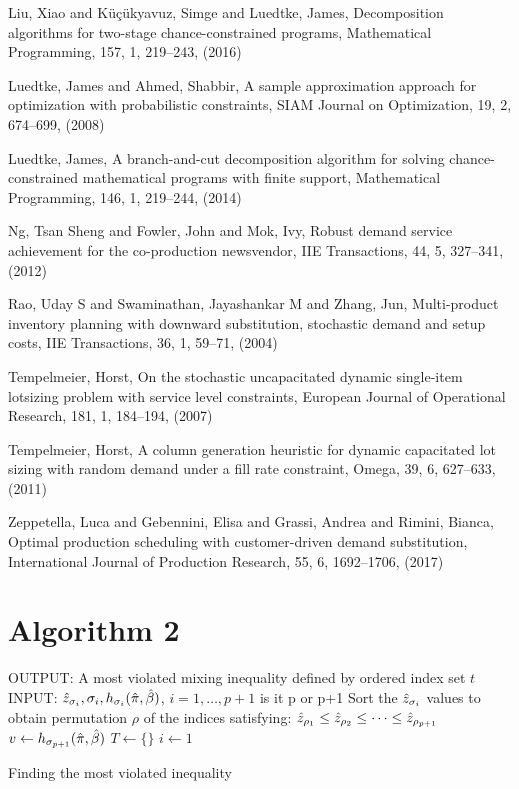 \documentclass[10pt]{article}
\newcommand{\ti}{t} %
\newcommand{\cred}{\color{red!65!black}}
\begin{document}
\begin{thebibliography}{99}
Liu, Xiao and K{\"u}{\c{c}}{\"u}kyavuz, Simge and Luedtke, James, 
Decomposition algorithms for two-stage chance-constrained programs, Mathematical Programming, 157,
  1, 219--243, (2016)
 

Luedtke, James and Ahmed, Shabbir, A sample approximation approach for optimization with probabilistic constraints, 
SIAM Journal on Optimization, 19,
2, 674--699, (2008)


  Luedtke, James, A branch-and-cut decomposition algorithm for solving chance-constrained mathematical programs with finite support,
  Mathematical Programming, 146, 1, 219--244,
 (2014)

Ng, Tsan Sheng and Fowler, John and Mok, Ivy, Robust demand service achievement for the co-production newsvendor, IIE Transactions,
  44,
  5,
 327--341,
  (2012)
  
 Rao, Uday S and Swaminathan, Jayashankar M and Zhang, Jun,
 Multi-product inventory planning with downward substitution, stochastic demand and setup costs,
 IIE Transactions, 36, 1, 59--71, (2004)
 
Tempelmeier, Horst, On the stochastic uncapacitated dynamic single-item lotsizing problem with service level constraints, European Journal of Operational Research, 181, 1, 184--194, (2007)
 

Tempelmeier, Horst, A column generation heuristic for dynamic capacitated lot sizing with random demand under a fill rate constraint, Omega, 39, 6, 627--633, (2011)
 

Zeppetella, Luca and Gebennini, Elisa and Grassi, Andrea and Rimini, Bianca, Optimal production scheduling with customer-driven demand substitution, International Journal of Production Research, 55, 6, 1692--1706, (2017)
 



\end{thebibliography}

\appendix


\section{Algorithm 2} \label{APP1}


\begin{algorithm}[H]
\label{alg:mostviolated}
\SetAlgoLined
{OUTPUT: A most violated mixing inequality defined by ordered index set $\ti$ } \;
INPUT: $\hat{z}_{\sigma_i}, \sigma_i, h_{\sigma_i}(\hat{\pi},\hat{\beta})$, $i=1,\ldots,p+1$  {\cred is it p or p+1}\;
Sort the $\hat{z}_{\sigma_i}$ values to obtain permutation $\rho$ of the indices satisfying:
$\hat{z}_{\rho_1} \leq \hat{z}_{\rho_2} \leq \cdots \leq \hat{z}_{\rho_{p+1}} $ \;
$v \gets h_{\sigma_{p+1}}(\hat{\pi},\hat{\beta})$\;
$T \gets \{ \}$\;
$ i \gets 1$\;
\caption{Finding the most violated inequality}
\end{algorithm}
\end{document}
